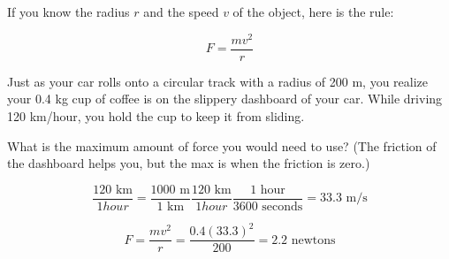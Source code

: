If you know the radius $r$ and the speed $v$ of the object, here is the rule:

$$F = \frac{m v^2}{r}$$

\begin{Exercise}[title={Circular Motion}, label=circular]
Just as your car rolls onto a circular track with a radius of 200 m,
you realize your 0.4 kg cup of coffee is on the slippery dashboard of your
car.  While driving 120 km/hour, you hold the cup to keep it from sliding.

What is the maximum amount of force you would need to use? (The friction of
the dashboard helps you, but the max is when the friction is zero.)

\end{Exercise}
\begin{Answer}[ref=circular]
  $$\frac{120 \text{ km}}{1 hour} = \frac{1000 \text{ m}}{1 \text{ km}}\frac{120 \text{ km}}{1 hour} \frac{1 \text{ hour}}{3600 \text{ seconds}}= 33.3 \text{ m/s}$$

  $$F = \frac{m v^2}{r} = \frac {0.4 (33.3)^2}{200} = 2.2 \text{ newtons}$$
\end{Answer}
